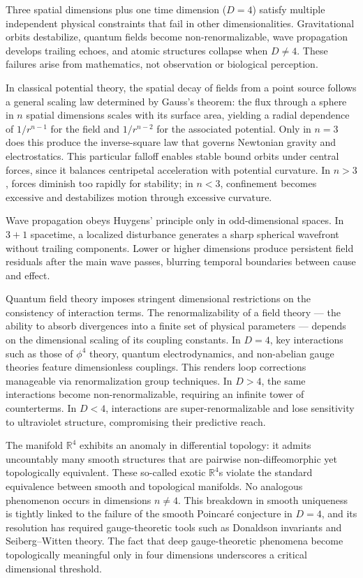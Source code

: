 Three spatial dimensions plus one time dimension ($D=4$) satisfy multiple independent physical constraints that fail in other dimensionalities. Gravitational orbits destabilize, quantum fields become non-renormalizable, wave propagation develops trailing echoes, and atomic structures collapse when $D \ne 4$. These failures arise from mathematics, not observation or biological perception.

In classical potential theory, the spatial decay of fields from a point source follows a general scaling law determined by Gauss’s theorem: the flux through a sphere in $n$ spatial dimensions scales with its surface area, yielding a radial dependence of $1/r^{n-1}$ for the field and $1/r^{n-2}$ for the associated potential. Only in $n=3$ does this produce the inverse-square law that governs Newtonian gravity and electrostatics. This particular falloff enables stable bound orbits under central forces, since it balances centripetal acceleration with potential curvature. In $n>3$, forces diminish too rapidly for stability; in $n<3$, confinement becomes excessive and destabilizes motion through excessive curvature.

Wave propagation obeys Huygens' principle only in odd-dimensional spaces. In $3+1$ spacetime, a localized disturbance generates a sharp spherical wavefront without trailing components. Lower or higher dimensions produce persistent field residuals after the main wave passes, blurring temporal boundaries between cause and effect.

Quantum field theory imposes stringent dimensional restrictions on the consistency of interaction terms. The renormalizability of a field theory — the ability to absorb divergences into a finite set of physical parameters — depends on the dimensional scaling of its coupling constants. In $D=4$, key interactions such as those of $\phi^4$ theory, quantum electrodynamics, and non-abelian gauge theories feature dimensionless couplings. This renders loop corrections manageable via renormalization group techniques. In $D>4$, the same interactions become non-renormalizable, requiring an infinite tower of counterterms. In $D<4$, interactions are super-renormalizable and lose sensitivity to ultraviolet structure, compromising their predictive reach.

The manifold $\mathbb{R}^4$ exhibits an anomaly in differential topology: it admits uncountably many smooth structures that are pairwise non-diffeomorphic yet topologically equivalent. These so-called exotic $\mathbb{R}^4$s violate the standard equivalence between smooth and topological manifolds. No analogous phenomenon occurs in dimensions $n \ne 4$. This breakdown in smooth uniqueness is tightly linked to the failure of the smooth Poincaré conjecture in $D=4$, and its resolution has required gauge-theoretic tools such as Donaldson invariants and Seiberg–Witten theory. The fact that deep gauge-theoretic phenomena become topologically meaningful only in four dimensions underscores a critical dimensional threshold.


